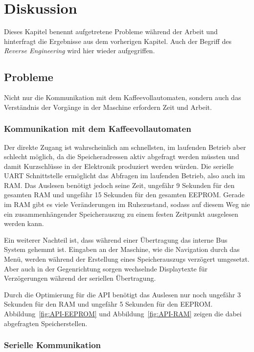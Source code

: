 \chapter{Diskussion}\label{ch:Diskussion}
Dieses Kapitel benennt aufgetretene Probleme während der Arbeit und hinterfragt die Ergebnisse aus dem vorherigen Kapitel.
Auch der Begriff des \textit{Reverse Engineering} wird hier wieder aufgegriffen.

\section{Probleme}
Nicht nur die Kommunikation mit dem Kaffeevollautomaten, sondern auch das Verständnis der Vorgänge in der Maschine erfordern Zeit und Arbeit.

\subsection{Kommunikation mit dem Kaffeevollautomaten} \label{subsec:zugangSeriellDirekt}
Der direkte Zugang ist wahrscheinlich am schnellsten, im laufenden Betrieb aber schlecht möglich, da die Speicheradressen aktiv abgefragt werden müssten und damit Kurzschlüsse in der Elektronik produziert werden würden.
Die serielle \ac{UART} Schnittstelle ermöglicht das Abfragen im laufenden Betrieb, also auch im \ac{RAM}.
Das Auslesen benötigt jedoch seine Zeit, ungefähr 9 Sekunden für den gesamten \ac{RAM} und ungefähr 15 Sekunden für den gesamten \ac{EEPROM}.
Gerade im \ac{RAM} gibt es viele Veränderungen im Ruhezustand, sodass auf diesem Weg nie ein zusammenhängender Speicherauszug zu einem festen Zeitpunkt ausgelesen werden kann.

Ein weiterer Nachteil ist, dass während einer Übertragung das interne Bus System gehemmt ist.
Eingaben an der Maschine, wie die Navigation durch das Menü, werden während der Erstellung eines Speicherauszugs verzögert umgesetzt.
Aber auch in der Gegenrichtung sorgen wechselnde Displaytexte für Verzögerungen während der seriellen Übertragung.

Durch die Optimierung für die \ac{API} benötigt das Auslesen nur noch ungefähr 3 Sekunden für den \ac{RAM} und ungefähr 5 Sekunden für den \ac{EEPROM}.
Abbildung~\ref{fig:API-EEPROM} und Abbildung~\ref{fig:API-RAM} zeigen die dabei abgefragten Speicherstellen.

\subsection{Serielle Kommunikation} \label{subsec:kommunikationGeraetedateiLibserialLibrary}
